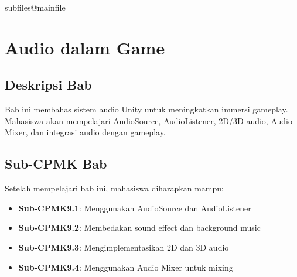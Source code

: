 \documentclass[../../main.tex]{subfiles}
\begin{document}
\ifcsname subfiles@mainfile\endcsname\else
    \setcounter{chapter}{8}
\fi
\chapter{Audio dalam Game}

\section{Deskripsi Bab}

Bab ini membahas sistem audio Unity untuk meningkatkan immersi gameplay. Mahasiswa akan mempelajari AudioSource, AudioListener, 2D/3D audio, Audio Mixer, dan integrasi audio dengan gameplay.

\section{Sub-CPMK Bab}

Setelah mempelajari bab ini, mahasiswa diharapkan mampu:
\begin{itemize}
\item \textbf{Sub-CPMK9.1}: Menggunakan AudioSource dan AudioListener
\item \textbf{Sub-CPMK9.2}: Membedakan sound effect dan background music
\item \textbf{Sub-CPMK9.3}: Mengimplementasikan 2D dan 3D audio
\item \textbf{Sub-CPMK9.4}: Menggunakan Audio Mixer untuk mixing
\end{itemize}








\end{document}
